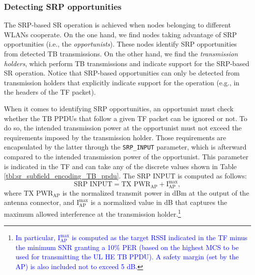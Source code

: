 \documentclass[comsoc]{IEEEtran}
\begin{document}
	\subsubsection{Detecting SRP opportunities}
	The SRP-based SR operation is achieved when nodes belonging to different WLANs cooperate. On the one hand, we find nodes taking advantage of SRP opportunities (i.e., the \emph{opportunists}). These nodes identify SRP opportunities from detected TB transmissions. On the other hand, we find the \emph{transmission holders}, which perform TB transmissions and indicate support for the SRP-based SR operation. Notice that SRP-based opportunities can only be detected from transmission holders that explicitly indicate support for the operation (e.g., in the headers of the TF packet).
	
	When it comes to identifying SRP opportunities, an opportunist must check whether the TB PPDUs that follow a given TF packet can be ignored or not. To do so, the intended transmission power at the opportunist must not exceed the requirements imposed by the transmission holder. Those requirements are encapsulated by the latter through the \texttt{SRP\_INPUT} parameter, which is afterward compared to the intended transmission power of the opportunist. This parameter is indicated in the TF and can take any of the discrete values shown in Table \ref{tbl:sr_subfield_encoding_TB_ppdu}. The SRP INPUT is computed as follows:
	\begin{equation}
	\text{SRP INPUT} = \text{TX PWR}_\text{AP} + \text{I}_\text{AP}^{\max},
	\label{eq:srp_input}
	\nonumber
	\end{equation}
	where $\text{TX PWR}_\text{AP}$ is the normalized transmit power in dBm at the output of the antenna connector, and $\text{I}_\text{AP}^{\max}$ is a normalized value in dB that captures the maximum allowed interference at the transmission holder.\footnote{\textcolor{blue}{In particular, $\text{I}_\text{AP}^{\max}$ is computed as the target RSSI indicated in the TF minus the minimum SNR granting a 10\% PER (based on the highest MCS to be used for transmitting the UL HE TB PPDU). A safety margin (set by the AP) is also included not to exceed 5 dB.}}
	
\end{document}
